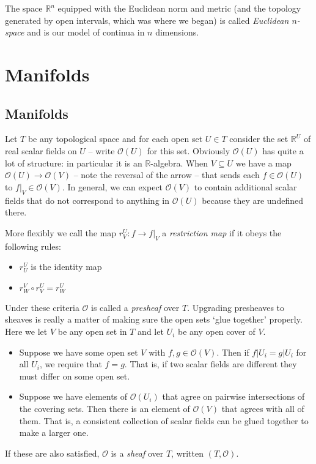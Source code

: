 \documentclass[oneside,english]{amsbook}
\numberwithin{section}{chapter}
\theoremstyle{plain}
\theoremstyle{definition}
\begin{document}
The space $\mathbb{R}^n$ equipped with the Euclidean norm and metric (and the topology generated by open intervals, which was where we began) is called \emph{Euclidean $n$-space} and is our model of continua in $n$ dimensions.

\section{Manifolds}

\subsection{Manifolds}

Let $T$ be any topological space and for each open set $U\in T$ consider the set $\mathbb{R}^U$ of real scalar fields on $U$ -- write $\mathscr{O}(U)$ for this set. Obviously $\mathscr{O}(U)$ has quite a lot of structure: in particular it is an $\mathbb{R}$-algebra. When $V\subseteq U$ we have a map $\mathscr{O}(U)\to \mathscr{O}(V)$ -- note the reversal of the arrow -- that sends each $f\in \mathscr{O}(U)$ to $f|_V\in\mathscr{O}(V)$. In general, we can expect $\mathscr{O}(V)$ to contain additional scalar fields that do not correspond to anything in $\mathscr{O}(U)$ because they are undefined there.

More flexibly we call the map $r^U_V: f\to f|_V$ a \emph{restriction map} if it obeys the following rules:
\begin{itemize}
	\item $r^U_U$ is the identity map
	\item $r^V_W\circ r^U_V = r^U_W$
\end{itemize}
Under these criteria  $\mathscr{O}$ is called a \emph{presheaf} over $T$. Upgrading presheaves to sheaves is really a matter of making sure the open sets `glue together' properly. Here we let $V$ be any open set in $T$ and let $U_i$ be any open cover of $V$.
\begin{itemize}
	\item Suppose we have some open set $V$ with $f, g\in \mathscr{O}(V)$. Then if $f|{U_i} = g|{U_i}$ for all $U_i$, we require that $f=g$. That is, if two scalar fields are different they must differ on some open set.
	\item Suppose we have elements of $\mathscr{O}(U_i)$ that agree on pairwise intersections of the covering sets. Then there is an element of $\mathscr{O}(V)$ that agrees with all of them. That is, a consistent collection of scalar fields can be glued together to make a larger one. 
\end{itemize}
If these are also satisfied, $\mathscr{O}$ is a \emph{sheaf} over $T$, written $(T, \mathscr{O})$.
\end{document}
